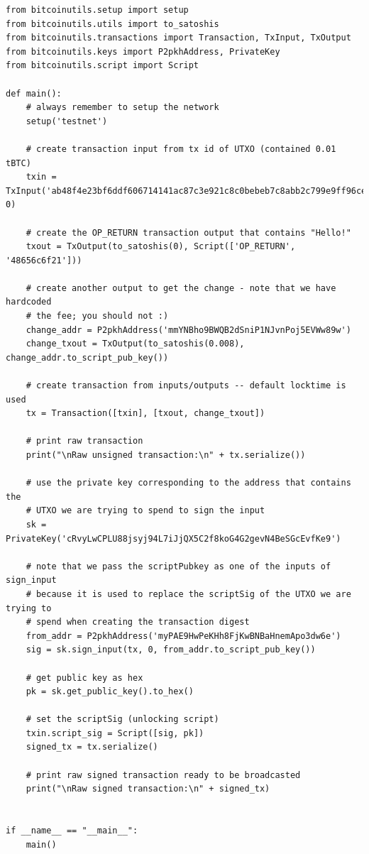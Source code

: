 \vspace{1em}
\begin{lstlisting}[style=Python]
from bitcoinutils.setup import setup
from bitcoinutils.utils import to_satoshis
from bitcoinutils.transactions import Transaction, TxInput, TxOutput
from bitcoinutils.keys import P2pkhAddress, PrivateKey
from bitcoinutils.script import Script

def main():
    # always remember to setup the network
    setup('testnet')

    # create transaction input from tx id of UTXO (contained 0.01 tBTC)
    txin = TxInput('ab48f4e23bf6ddf606714141ac87c3e921c8c0bebeb7c8abb2c799e9ff96ce6f', 0)

    # create the OP_RETURN transaction output that contains "Hello!"
    txout = TxOutput(to_satoshis(0), Script(['OP_RETURN', '48656c6f21']))

    # create another output to get the change - note that we have hardcoded
    # the fee; you should not :)
    change_addr = P2pkhAddress('mmYNBho9BWQB2dSniP1NJvnPoj5EVWw89w')
    change_txout = TxOutput(to_satoshis(0.008), change_addr.to_script_pub_key())

    # create transaction from inputs/outputs -- default locktime is used
    tx = Transaction([txin], [txout, change_txout])

    # print raw transaction
    print("\nRaw unsigned transaction:\n" + tx.serialize())

    # use the private key corresponding to the address that contains the
    # UTXO we are trying to spend to sign the input
    sk = PrivateKey('cRvyLwCPLU88jsyj94L7iJjQX5C2f8koG4G2gevN4BeSGcEvfKe9')

    # note that we pass the scriptPubkey as one of the inputs of sign_input
    # because it is used to replace the scriptSig of the UTXO we are trying to
    # spend when creating the transaction digest
    from_addr = P2pkhAddress('myPAE9HwPeKHh8FjKwBNBaHnemApo3dw6e')
    sig = sk.sign_input(tx, 0, from_addr.to_script_pub_key())

    # get public key as hex
    pk = sk.get_public_key().to_hex()

    # set the scriptSig (unlocking script)
    txin.script_sig = Script([sig, pk])
    signed_tx = tx.serialize()

    # print raw signed transaction ready to be broadcasted
    print("\nRaw signed transaction:\n" + signed_tx)


if __name__ == "__main__":
    main()
\end{lstlisting}
\vspace{1em}



